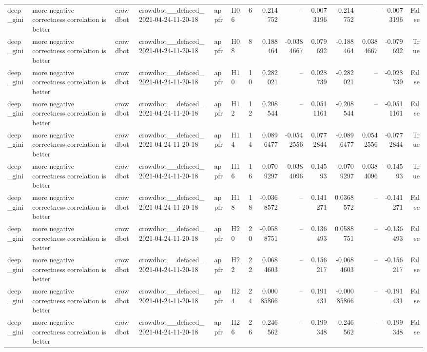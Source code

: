 \begin{longtable}{llllllrrrrrrrr}
deep\_gini & more negative correctness correlation is better & crowdbot & crowdbot\_\_defaced\_2021-04-24-11-20-18 & appfr & H06 & 6 & 0.214752 & -- & 0.0073196 & -0.214752 & -- & -0.0073196 & False \\
deep\_gini & more negative correctness correlation is better & crowdbot & crowdbot\_\_defaced\_2021-04-24-11-20-18 & appfr & H08 & 8 & 0.188464 & -0.0384667 & 0.079692 & -0.188464 & 0.0384667 & -0.079692 & True \\
deep\_gini & more negative correctness correlation is better & crowdbot & crowdbot\_\_defaced\_2021-04-24-11-20-18 & appfr & H10 & 10 & 0.282021 & -- & 0.028739 & -0.282021 & -- & -0.028739 & False \\
deep\_gini & more negative correctness correlation is better & crowdbot & crowdbot\_\_defaced\_2021-04-24-11-20-18 & appfr & H12 & 12 & 0.208544 & -- & 0.0511161 & -0.208544 & -- & -0.0511161 & False \\
deep\_gini & more negative correctness correlation is better & crowdbot & crowdbot\_\_defaced\_2021-04-24-11-20-18 & appfr & H14 & 14 & 0.0896477 & -0.0542556 & 0.0772844 & -0.0896477 & 0.0542556 & -0.0772844 & True \\
deep\_gini & more negative correctness correlation is better & crowdbot & crowdbot\_\_defaced\_2021-04-24-11-20-18 & appfr & H16 & 16 & 0.0709297 & -0.0384096 & 0.14593 & -0.0709297 & 0.0384096 & -0.14593 & True \\
deep\_gini & more negative correctness correlation is better & crowdbot & crowdbot\_\_defaced\_2021-04-24-11-20-18 & appfr & H18 & 18 & -0.0368572 & -- & 0.141271 & 0.0368572 & -- & -0.141271 & False \\
deep\_gini & more negative correctness correlation is better & crowdbot & crowdbot\_\_defaced\_2021-04-24-11-20-18 & appfr & H20 & 20 & -0.0588751 & -- & 0.136493 & 0.0588751 & -- & -0.136493 & False \\
deep\_gini & more negative correctness correlation is better & crowdbot & crowdbot\_\_defaced\_2021-04-24-11-20-18 & appfr & H22 & 22 & 0.0684603 & -- & 0.156217 & -0.0684603 & -- & -0.156217 & False \\
deep\_gini & more negative correctness correlation is better & crowdbot & crowdbot\_\_defaced\_2021-04-24-11-20-18 & appfr & H24 & 24 & 0.00085866 & -- & 0.191431 & -0.00085866 & -- & -0.191431 & False \\
deep\_gini & more negative correctness correlation is better & crowdbot & crowdbot\_\_defaced\_2021-04-24-11-20-18 & appfr & H26 & 26 & 0.246562 & -- & 0.199348 & -0.246562 & -- & -0.199348 & False \\

\end{longtable}
